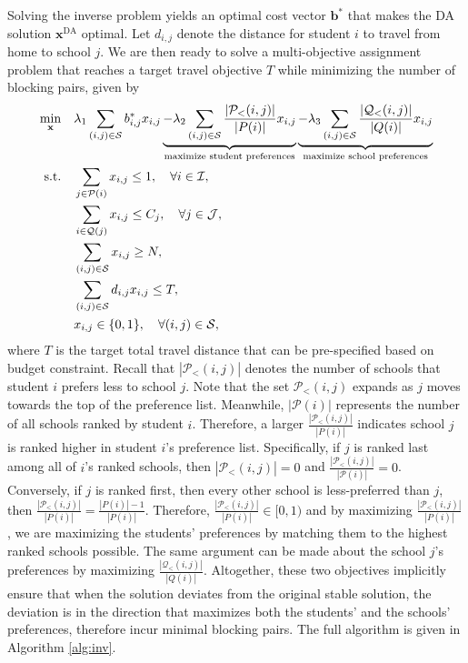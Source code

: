 \documentclass[11pt]{article}
\begin{document}
Solving the inverse problem yields an optimal cost vector $\mathbf{ b^*}$ that makes the DA solution $\mathbf{x}^{\text{DA}}$ optimal. Let $d_{i,j}$ denote the distance for student $i$ to travel from home to school $j$. 
We are then ready to solve a multi-objective assignment problem that reaches a target travel objective $T$ while minimizing the number of blocking pairs, given by 
\begin{align}
    \min_{{\bf x}} \quad &\lambda_1 \sum_{(i,j) \in \mathcal{S}}b^*_{i,j}x_{i,j} \underbrace{- \lambda_2 \sum_{(i,j) \in \mathcal{S}} \frac{|\mathcal{P}_<(i,j)|}{|P(i)|}x_{i,j}}_{\text{maximize student preferences}} \underbrace{- \lambda_3 \sum_{(i,j) \in \mathcal{S}} \frac{|\mathcal{Q}_<(i,j)|}{|Q(i)|}x_{i,j}}_{\text{maximize school preferences}} \\
    \text{s.t.} \quad & \sum_{j \in \mathcal{P}(i)} x_{i,j} \le 1, \quad \forall i \in \mathcal{I}, \\
    & \sum_{i \in \mathcal{Q}(j)} x_{i,j} \le C_j, \quad \forall j \in \mathcal{J}, \\ 
    & \sum_{(i,j) \in \mathcal{S}} x_{i,j} \ge N, \\ 
    & \sum_{(i,j) \in \mathcal{S}} d_{i,j}x_{i,j} \le T,\label{const:strict_travel} \\
    &x_{i,j} \in \{0,1\}, \quad \forall (i,j) \in \mathcal{S},
\end{align}
where $T$ is the target total travel distance that can be pre-specified based on budget constraint. 
Recall that $|\mathcal{P}_<(i,j)|$ denotes the number of schools that student $i$ prefers less to school $j$. Note that the set $\mathcal{P}_<(i,j)$ expands as $j$ moves towards the top of the preference list. Meanwhile, $|\mathcal{P}(i)|$ represents the number of all schools ranked by student $i$. 
Therefore, a larger $\frac{|\mathcal{P}_<(i,j)|}{|P(i)|}$ indicates school $j$ is ranked higher in student $i$'s preference list. 
Specifically, if $j$ is ranked last among all of $i$'s ranked schools, then  $|\mathcal{P}_<(i,j)| = 0$ and $\frac{|\mathcal{P}_<(i,j)|}{|\mathcal{P}(i)|} =0$. Conversely, if $j$ is ranked first, then every other school is less-preferred than $j$, then $\frac{|\mathcal{P}_<(i,j)|}{|P(i)|} = \frac{|P(i)|-1}{|P(i)|}$. Therefore, $\frac{|\mathcal{P}_<(i,j)|}{|P(i)|} \in [0,1)$ and by maximizing $\frac{|\mathcal{P}_<(i,j)|}{|P(i)|}$, we are maximizing the students' preferences by matching them to the highest ranked schools possible. The same argument can be made about the school $j$'s preferences by maximizing $\frac{|\mathcal{Q}_<(i,j)|}{|Q(i)|}$. Altogether, these two objectives implicitly ensure that when the solution deviates from the original stable solution, the deviation is in the direction that maximizes both the students' and the schools' preferences, therefore incur minimal blocking pairs. 
The full algorithm is given in Algorithm \ref{alg:inv}.
\end{document}
